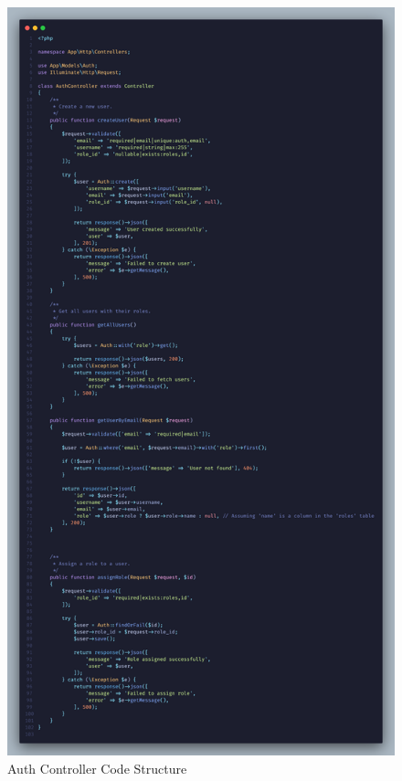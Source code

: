 \begin{figure}[H]
    \centering
    \includegraphics[width=1.0\textwidth]{./figures/implementation/Auth Controller.png}
    \caption{Auth Controller Code Structure}
    \label{fig:auth_controller}
\end{figure}

